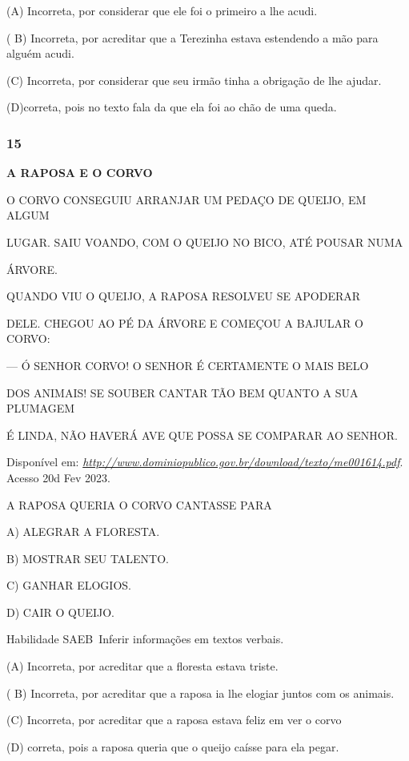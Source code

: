 \begin{escola}
(A) Incorreta, por considerar que ele foi o primeiro a lhe acudi.

( B) Incorreta, por acreditar que a Terezinha estava estendendo a mão
para alguém acudi.

(C) Incorreta, por considerar que seu irmão tinha a obrigação de lhe
ajudar.

(D)correta, pois no texto fala da que ela foi ao chão de uma queda.

\subsubsection{15 }\label{section-71}

\textbf{A RAPOSA E O CORVO}

O CORVO CONSEGUIU ARRANJAR UM PEDAÇO DE QUEIJO, EM ALGUM

LUGAR. SAIU VOANDO, COM O QUEIJO NO BICO, ATÉ POUSAR NUMA

ÁRVORE.

QUANDO VIU O QUEIJO, A RAPOSA RESOLVEU SE APODERAR

DELE. CHEGOU AO PÉ DA ÁRVORE E COMEÇOU A BAJULAR O CORVO:

--- Ó SENHOR CORVO! O SENHOR É CERTAMENTE O MAIS BELO

DOS ANIMAIS! SE SOUBER CANTAR TÃO BEM QUANTO A SUA PLUMAGEM

É LINDA, NÃO HAVERÁ AVE QUE POSSA SE COMPARAR AO SENHOR.

Disponível em:
\href{http://www.dominiopublico.gov.br/download/texto/me001614.pdf}{\emph{http://www.dominiopublico.gov.br/download/texto/me001614.pdf}}.
Acesso 20d Fev 2023.

A RAPOSA QUERIA O CORVO CANTASSE PARA

A) ALEGRAR A FLORESTA.

B) MOSTRAR SEU TALENTO.

C) GANHAR ELOGIOS.

D) CAIR O QUEIJO.

Habilidade SAEB~Inferir informações em textos verbais.

(A) Incorreta, por acreditar que a floresta estava triste.

( B) Incorreta, por acreditar que a raposa ia lhe elogiar juntos com os
animais.

(C) Incorreta, por acreditar que a raposa estava feliz em ver o corvo

(D) correta, pois a raposa queria que o queijo caísse para ela
pegar.\protect\hypertarget{_heading=h.jen2jvep4ux3}{}{}


\end{escola}
